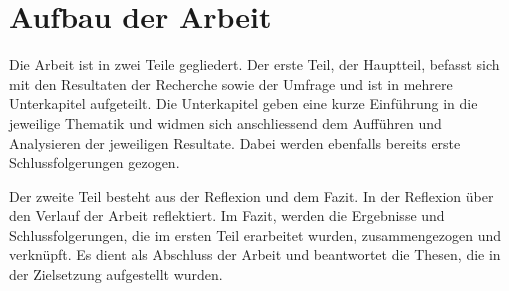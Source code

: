 \section{Aufbau der Arbeit}

Die Arbeit ist in zwei Teile gegliedert. 
Der erste Teil, der Hauptteil, befasst sich mit den Resultaten der Recherche sowie der Umfrage und ist in mehrere Unterkapitel aufgeteilt. Die Unterkapitel geben eine kurze Einführung in die jeweilige Thematik und widmen sich anschliessend dem Aufführen und Analysieren der jeweiligen Resultate. Dabei werden ebenfalls bereits erste Schlussfolgerungen gezogen. 

Der zweite Teil besteht aus der Reflexion und dem Fazit. In der Reflexion über den Verlauf der Arbeit reflektiert. Im Fazit, werden die Ergebnisse und Schlussfolgerungen, die im ersten Teil erarbeitet wurden, zusammengezogen und verknüpft. Es dient als Abschluss der Arbeit und beantwortet die Thesen, die in der Zielsetzung aufgestellt wurden.
\newpage